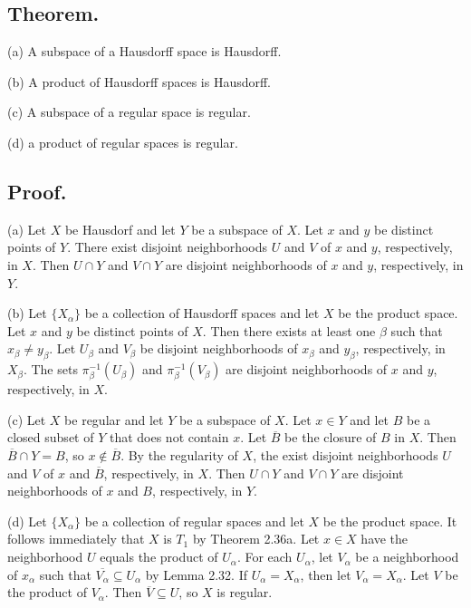 \documentclass[titlepage]{article}
\begin{document}
\subsection{Theorem.}

(a) A subspace of a Hausdorff space is Hausdorff.

(b) A product of Hausdorff spaces is Hausdorff.

(c) A subspace of a regular space is regular.

(d) a product of regular spaces is regular.

\subsection{Proof.}

(a) Let $X$ be Hausdorf and let $Y$ be a subspace of $X$. Let $x$ and $y$ be distinct points of $Y$. There exist disjoint neighborhoods $U$ and $V$ of $x$ and $y$, respectively, in $X$. Then $U \cap Y$ and $V \cap Y$ are disjoint neighborhoods of $x$ and $y$, respectively, in $Y$.

(b) Let $\{X_{\alpha}\}$ be a collection of Hausdorff spaces and let $X$ be the product space. Let $x$ and $y$ be distinct points of $X$. Then there exists at least one $\beta$ such that $x_{\beta} \neq y_{\beta}$. Let $U_{\beta}$ and $V_{\beta}$ be disjoint neighborhoods of $x_{\beta}$ and $y_{\beta}$, respectively, in $X_{\beta}$. The sets $\pi_{\beta}^{-1}(U_{\beta})$ and $\pi_{\beta}^{-1}(V_{\beta})$ are disjoint neighborhoods of $x$ and $y$, respectively, in $X$.

(c) Let $X$ be regular and let $Y$ be a subspace of $X$. Let $x \in Y$ and let $B$ be a closed subset of $Y$ that does not contain $x$. Let $\overline{B}$ be the closure of $B$ in $X$. Then $\overline{B} \cap Y = B$, so $x \not\in \overline{B}$. By the regularity of $X$, the exist disjoint neighborhoods $U$ and $V$ of $x$ and $\overline{B}$, respectively, in $X$. Then $U \cap Y$ and $V \cap Y$ are disjoint neighborhoods of $x$ and $B$, respectively, in $Y$.

(d) Let $\{X_{\alpha}\}$ be a collection of regular spaces and let $X$ be the product space. It follows immediately that $X$ is $T_{1}$ by Theorem 2.36a. Let $x \in X$ have the neighborhood $U$ equals the product of $U_{\alpha}$. For each $U_{\alpha}$, let $V_{\alpha}$ be a neighborhood of $x_{\alpha}$ such that $\overline{V_{\alpha}} \subseteq U_{\alpha}$ by Lemma 2.32. If $U_{\alpha} = X_{\alpha}$, then let $V_{\alpha} = X_{\alpha}$. Let $V$ be the product of $V_{\alpha}$. Then $\overline{V} \subseteq U$, so $X$ is regular.
\end{document}
